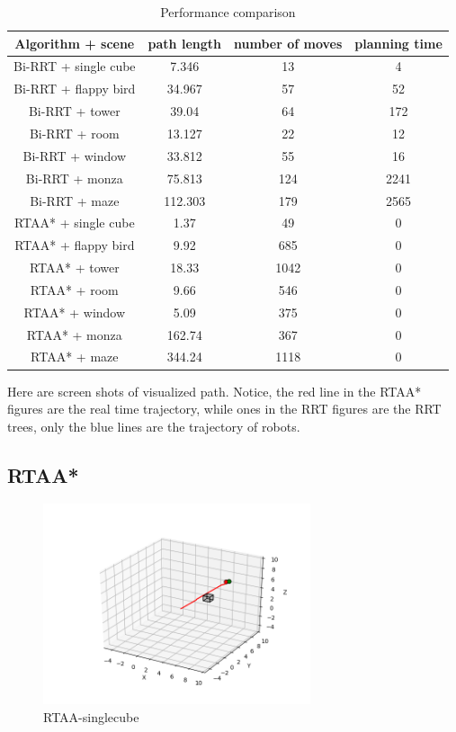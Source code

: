 \documentclass{article} %
\begin{document}
\begin{table}[H]
    \centering
    \caption{Performance comparison}
\begin{tabular}{|c|*{3}{c|}}
    \hline
    Algorithm + scene & path length & number of moves & planning time \\
    \hline
    Bi-RRT + single cube & 7.346 & 13 & 4 \\
    \hline
    Bi-RRT + flappy bird & 34.967 & 57 & 52 \\
    \hline
    Bi-RRT + tower & 39.04 & 64 & 172\\
    \hline
    Bi-RRT + room & 13.127 & 22 & 12 \\
    \hline
    Bi-RRT + window & 33.812 & 55 & 16 \\
    \hline
    Bi-RRT + monza & 75.813 & 124 & 2241 \\
    \hline
    Bi-RRT + maze & 112.303 & 179 & 2565 \\
    \hline
    RTAA* + single cube & 1.37 & 49 & 0 \\
    \hline
    RTAA* + flappy bird & 9.92 & 685 & 0 \\
    \hline
    RTAA* + tower & 18.33 & 1042 & 0 \\
    \hline
    RTAA* + room & 9.66 & 546 & 0 \\
    \hline
    RTAA* + window & 5.09 & 375 & 0 \\
    \hline
    RTAA* + monza & 162.74 & 367 & 0 \\
    \hline
    RTAA* + maze & 344.24 & 1118 & 0 \\
    \hline
\end{tabular}
\end{table}

Here are screen shots of visualized path. Notice, the red line in the RTAA* figures are the real time trajectory, while ones in the RRT figures are the RRT trees, only the blue lines are the trajectory of robots.

\subsection{RTAA*}

\begin{figure}[H]
	\centering
    \includegraphics[width=0.7\textwidth]{./images/RTAA-singlecube.png}
    \caption{RTAA-singlecube}
    \label{RTAA-singlecube}
\end{figure}
\end{document}
